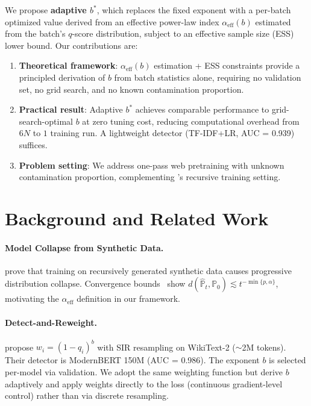 \documentclass[11pt,a4paper]{article}
\newcommand{\bstar}{b^{*}}
\newcommand{\aeff}{\alpha_{\mathrm{eff}}}
\begin{document}
We propose \textbf{adaptive $\bstar$}, which replaces the fixed exponent with a per-batch optimized value derived from an effective power-law index $\aeff(b)$ estimated from the batch's $q$-score distribution, subject to an effective sample size (ESS) lower bound.
Our contributions are:
\begin{enumerate}[nosep,leftmargin=*]
    \item \textbf{Theoretical framework}: $\aeff(b)$ estimation + ESS constraints provide a principled derivation of $b$ from batch statistics alone, requiring no validation set, no grid search, and no known contamination proportion.
    \item \textbf{Practical result}: Adaptive $\bstar$ achieves comparable performance to grid-search-optimal $b$ at zero tuning cost, reducing computational overhead from $6N$ to $1$ training run. A lightweight detector (TF-IDF+LR, AUC = 0.939) suffices.
    \item \textbf{Problem setting}: We address one-pass web pretraining with unknown contamination proportion, complementing \citet{drayson2025}'s recursive training setting.
\end{enumerate}

\section{Background and Related Work}
\label{sec:related}

\paragraph{Model Collapse from Synthetic Data.}
\citet{shumailov2024strong} prove that training on recursively generated synthetic data causes progressive distribution collapse.
Convergence bounds~\cite{convergencetheory2025} show $d(\hat{\mathbb{P}}_t, \mathbb{P}_0) \lesssim t^{-\min\{p,\alpha\}}$, motivating the $\aeff$ definition in our framework.

\paragraph{Detect-and-Reweight.}
\citet{drayson2025} propose $w_i = (1-q_i)^b$ with SIR resampling on WikiText-2 ($\sim$2M tokens).
Their detector is ModernBERT 150M (AUC = 0.986).
The exponent $b$ is selected per-model via validation.
We adopt the same weighting function but derive $b$ adaptively and apply weights directly to the loss (continuous gradient-level control) rather than via discrete resampling.
\end{document}

